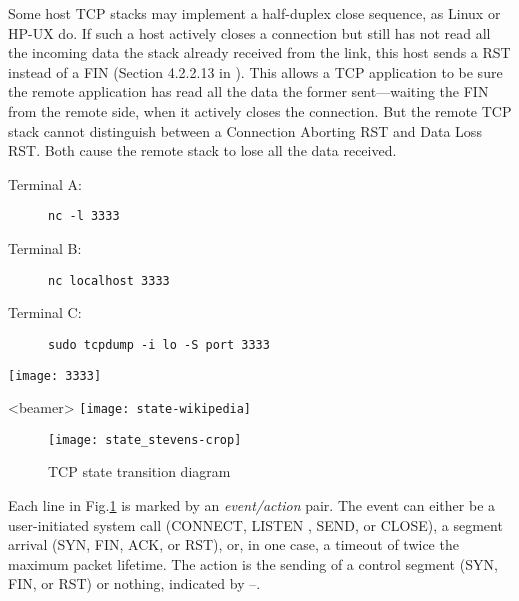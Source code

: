 Some host TCP stacks may implement a half-duplex close sequence, as Linux or HP-UX do. If
such a host actively closes a connection but still has not read all the incoming data the
stack already received from the link, this host sends a RST instead of a FIN (Section
4.2.2.13 in ). This allows a TCP application to be sure the
remote application has read all the data the former sent—waiting the FIN from the remote
side, when it actively closes the connection. But the remote TCP stack cannot distinguish
between a Connection Aborting RST and Data Loss RST. Both cause the remote stack to lose
all the data received.

\begin{frame}%
  \begin{minipage}{.78\linewidth}
    \begin{description}
    \item[Terminal A:] \texttt{nc -l 3333}
    \item[Terminal B:] \texttt{nc localhost 3333}
    \item[Terminal C:] \texttt{sudo tcpdump -i lo -S port 3333}
    \end{description}
  \end{minipage}\hfill
  \begin{minipage}{.2\linewidth}
    \texttt{[image: 3333]}
  \end{minipage}
  \begin{center}
  \end{center}
\end{frame}

\begin{frame}<beamer>
  \centering
  \texttt{[image: state-wikipedia]}
\end{frame}

\begin{figure}[!ht]
  \centering
  \texttt{[image: state\_stevens-crop]}
  \caption{TCP state transition diagram\label{fig:state}}
\end{figure}

Each line in Fig.\ref{fig:state} is marked by an \emph{event/action} pair. The event can
either be a user-initiated system call (CONNECT, LISTEN , SEND, or CLOSE), a segment
arrival (SYN, FIN, ACK, or RST), or, in one case, a timeout of twice the maximum packet
lifetime. The action is the sending of a control segment (SYN, FIN, or RST) or nothing,
indicated by --.

